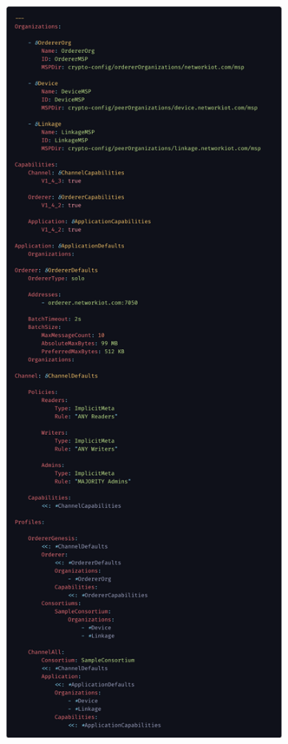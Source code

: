 \begin{figure}[h!]
  \begin{subfigure}{0.5\textwidth}
    \includegraphics[width=\linewidth]{imagenes/desarrollo/configtx}

\end{subfigure}
\end{figure}
